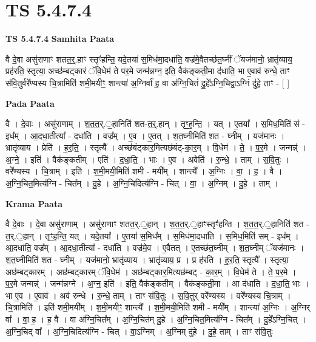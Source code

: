 \documentclass[17pt]{extarticle}
\begin{document}
\section{ TS 5.4.7.4 }

\textbf{TS 5.4.7.4 } \newline
\textbf{Samhita Paata} \newline

वै दे॒वा असु॑राणाꣳ शतत॒र्॒.हाꣳ स्तृꣳ॑हन्ति॒ यदे॒तया॑ स॒मिध॑मा॒दधा॑ति॒ वज्र॑मे॒वैतच्छ॑त॒घ्नीं ॅयज॑मानो॒ भ्रातृ॑व्याय॒ प्रह॑रति॒ स्तृत्या॒ अच्छ॑म्बट्कारं ॅवि॒धेम॑ ते पर॒मे जन्म॑न्नग्न॒ इति॒ वैक॑ङ्कती॒मा द॑धाति॒ भा ए॒वाव॑ रुन्धे॒ ताꣳ स॑वि॒तुर्वरे᳚ण्यस्य चि॒त्रामिति॑ शमी॒मयीꣳ॒॒ शान्त्या॑ अ॒ग्निर्वा॑ ह॒ वा अ॑ग्नि॒चितं॑ दु॒हे᳚ऽग्नि॒चिद्वा॒ऽग्निं दु॑हे॒ ताꣳ - [  ] \newline

\textbf{Pada Paata} \newline

वै । दे॒वाः । असु॑राणाम् । श॒त॒त॒र्.॒हानिति॑ शत-त॒र्॒.हान् । तृꣳ॒॒ह॒न्ति॒ । यत् । ए॒तया᳚ । स॒मिध॒मिति॑ सं - इध᳚म् । आ॒दधा॒तीत्या᳚ - दधा॑ति । वज्र᳚म् । ए॒व । ए॒तत् । श॒त॒घ्नीमिति॑ शत - घ्नीम् । यज॑मानः । भ्रातृ॑व्याय । प्रेति॑ । ह॒र॒ति॒ । स्तृत्यै᳚ । अच्छ॑बंट्कार॒मित्यछ॑बंट्-का॒र॒म् । वि॒धेम॑ । ते॒ । प॒र॒मे । जन्मन्न्॑ । अ॒ग्ने॒ । इति॑ । वैक॑ङ्कतीम् । एति॑ । द॒धा॒ति॒ । भाः । ए॒व । अवेति॑ । रु॒न्धे॒ । ताम् । स॒वि॒तुः । वरे᳚ण्यस्य । चि॒त्राम् । इति॑ । श॒मी॒मयी॒मिति॑ शमी - मयी᳚म् । शान्त्यै᳚ । अ॒ग्निः । वा॒ । ह॒ । वै । अ॒ग्नि॒चित॒मित्य॑ग्नि - चित᳚म् । दु॒हे । अ॒ग्नि॒चिदित्य॑ग्नि - चित् । वा॒ । अ॒ग्निम् । दु॒हे॒ । ताम् ।  \newline


\textbf{Krama Paata} \newline

वै दे॒वाः । दे॒वा असु॑राणाम् । असु॑राणाꣳ शतत॒र्.॒हान् । श॒त॒त॒र्.॒हाꣳस्तृꣳ॑हन्ति । श॒त॒त॒र्.॒हानिति॑ शत - त॒र्.॒हान् । तृꣳ॒॒ह॒न्ति॒ यत् । यदे॒तया᳚ । ए॒तया॑ स॒मिध᳚म् । स॒मिध॑मा॒दधा॑ति । स॒मिध॒मिति॑ सम् - इध᳚म् । आ॒दधा॑ति॒ वज्र᳚म् । आ॒दधा॒तीत्या᳚ - दधा॑ति । वज्र॑मे॒व । ए॒वैतत् । ए॒तच्छ॑त॒घ्नीम् । श॒त॒घ्नीम् ॅयज॑मानः । श॒त॒घ्नीमिति॑ शत - घ्नीम् । यज॑मानो॒ भ्रातृ॑व्याय । भ्रातृ॑व्याय॒ प्र । प्र ह॑रति । ह॒र॒ति॒ स्तृत्यै᳚ । स्तृत्या॒ अछ॑म्बट्कारम् । अछ॑म्बट्कारम् ॅवि॒धेम॑ । अछ॑म्बट्कार॒मित्यछ॑म्बट् - का॒र॒म् । वि॒धेम॑ ते । ते॒ प॒र॒मे । प॒र॒मे जन्मन्न्॑ । जन्म॑न्नग्ने । अ॒ग्न॒ इति॑ । इति॒ वैक॑ङ्कतीम् । वैक॑ङ्कती॒मा । आ द॑धाति । द॒धा॒ति॒ भाः । भा ए॒व । ए॒वाव॑ । अव॑ रुन्धे । रु॒न्धे॒ ताम् । ताꣳ स॑वि॒तुः । स॒वि॒तुर् वरे᳚ण्यस्य । वरे᳚ण्यस्य चि॒त्राम् । चि॒त्रामिति॑ । इति॑ शमी॒मयी᳚म् । श॒मी॒मयीꣳ॒॒ शान्त्यै᳚ । श॒मी॒मयी॒मिति॑ शमी - मयी᳚म् । शान्त्या॑ अ॒ग्निः । अ॒ग्निर् वा᳚ । वा॒ ह॒ । ह॒ वै । वा अ॑ग्नि॒चित᳚म् । अ॒ग्नि॒चित॑म् दु॒हे । अ॒ग्नि॒चित॒मित्य॑ग्नि - चित᳚म् । दु॒हे᳚ऽग्नि॒चित् । अ॒ग्नि॒चिद् वा᳚ । अ॒ग्नि॒चिदित्य॑ग्नि - चित् । वा॒ऽग्निम् । अ॒ग्निम् दु॑हे । दु॒हे॒ ताम् । ताꣳ स॑वि॒तुः \newline
\end{document}
